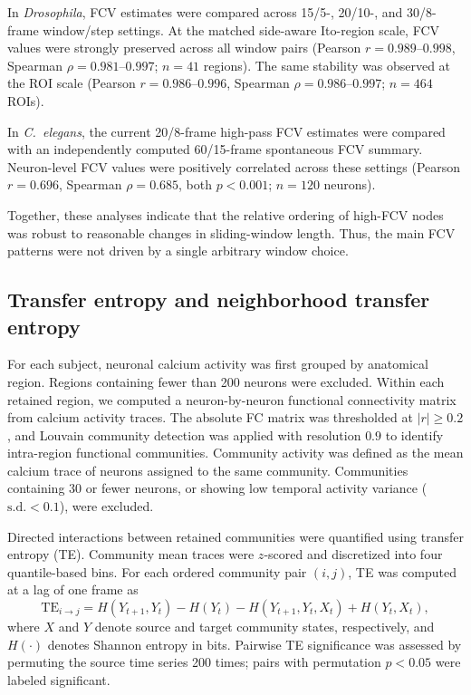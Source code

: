 \documentclass[9pt,twoside]{pnas-new}
\begin{document}
In \textit{Drosophila}, FCV estimates were compared across 15/5-, 20/10-, and 30/8-frame window/step settings. At the matched side-aware Ito-region scale, FCV values were strongly preserved across all window pairs (Pearson $r=0.989$--$0.998$, Spearman $\rho=0.981$--$0.997$; $n=41$ regions). The same stability was observed at the ROI scale (Pearson $r=0.986$--$0.996$, Spearman $\rho=0.986$--$0.997$; $n=464$ ROIs).

In \textit{C.~elegans}, the current 20/8-frame high-pass FCV estimates were compared with an independently computed 60/15-frame spontaneous FCV summary. Neuron-level FCV values were positively correlated across these settings (Pearson $r=0.696$, Spearman $\rho=0.685$, both $p<0.001$; $n=120$ neurons).

Together, these analyses indicate that the relative ordering of high-FCV nodes was robust to reasonable changes in sliding-window length. Thus, the main FCV patterns were not driven by a single arbitrary window choice.



\subsection*{Transfer entropy and neighborhood transfer entropy}

For each subject, neuronal calcium activity was first grouped by anatomical region. Regions containing fewer than 200 neurons were excluded. Within each retained region, we computed a neuron-by-neuron functional connectivity matrix from calcium activity traces. The absolute FC matrix was thresholded at $|r| \geq 0.2$, and Louvain community detection was applied with resolution $0.9$ to identify intra-region functional communities. Community activity was defined as the mean calcium trace of neurons assigned to the same community. Communities containing 30 or fewer neurons, or showing low temporal activity variance ($\mathrm{s.d.}<0.1$), were excluded.

Directed interactions between retained communities were quantified using transfer entropy (TE). Community mean traces were $z$-scored and discretized into four quantile-based bins. For each ordered community pair $(i,j)$, TE was computed at a lag of one frame as
\begin{equation}
\mathrm{TE}_{i \rightarrow j}
=
H(Y_{t+1},Y_t)-H(Y_t)
-
H(Y_{t+1},Y_t,X_t)+H(Y_t,X_t),
\end{equation}
where $X$ and $Y$ denote source and target community states, respectively, and $H(\cdot)$ denotes Shannon entropy in bits. Pairwise TE significance was assessed by permuting the source time series 200 times; pairs with permutation $p<0.05$ were labeled significant.
\end{document}

